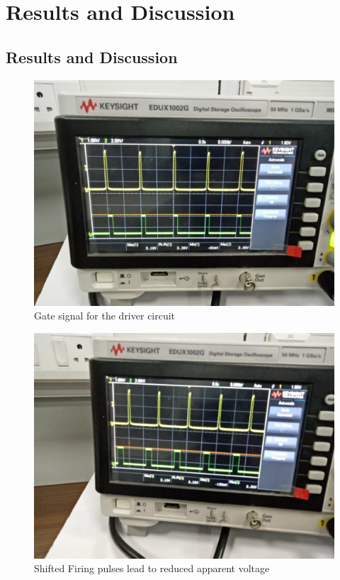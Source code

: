  \chapter{Results and Discussion}
        \section{Results and Discussion}
        
        \begin{figure}[h!]
        	\includegraphics[width=\textwidth]{photos/results/InterruptTriggerofmicrocontroller.jpg}
        	\caption{Gate signal for the driver circuit}
        \end{figure}
	    \begin{figure}[h!]
	    	\includegraphics[width=\textwidth]{photos/results/ZeroCrossingCircuitWaveform.jpg}
	    	\caption{Shifted Firing pulses lead to reduced apparent voltage}
	    \end{figure}
